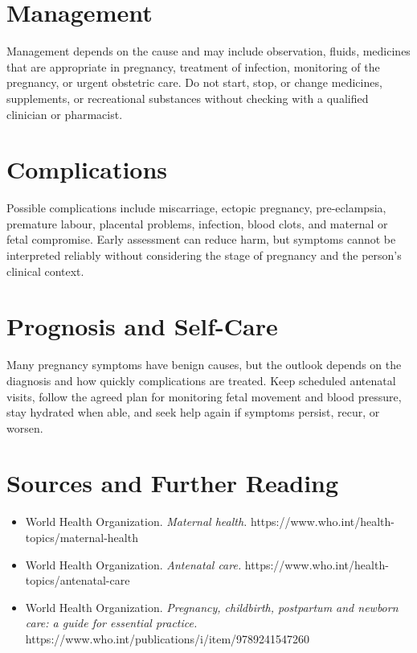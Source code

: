 \section*{Management}
Management depends on the cause and may include observation, fluids, medicines that are appropriate in pregnancy, treatment of infection, monitoring of the pregnancy, or urgent obstetric care. Do not start, stop, or change medicines, supplements, or recreational substances without checking with a qualified clinician or pharmacist.

\section*{Complications}
Possible complications include miscarriage, ectopic pregnancy, pre-eclampsia, premature labour, placental problems, infection, blood clots, and maternal or fetal compromise. Early assessment can reduce harm, but symptoms cannot be interpreted reliably without considering the stage of pregnancy and the person's clinical context.

\section*{Prognosis and Self-Care}
Many pregnancy symptoms have benign causes, but the outlook depends on the diagnosis and how quickly complications are treated. Keep scheduled antenatal visits, follow the agreed plan for monitoring fetal movement and blood pressure, stay hydrated when able, and seek help again if symptoms persist, recur, or worsen.

\section*{Sources and Further Reading}
\begin{itemize}
    \item World Health Organization. \textit{Maternal health.} https://www.who.int/health-topics/maternal-health
    \item World Health Organization. \textit{Antenatal care.} https://www.who.int/health-topics/antenatal-care
    \item World Health Organization. \textit{Pregnancy, childbirth, postpartum and newborn care: a guide for essential practice.} https://www.who.int/publications/i/item/9789241547260
\end{itemize}
